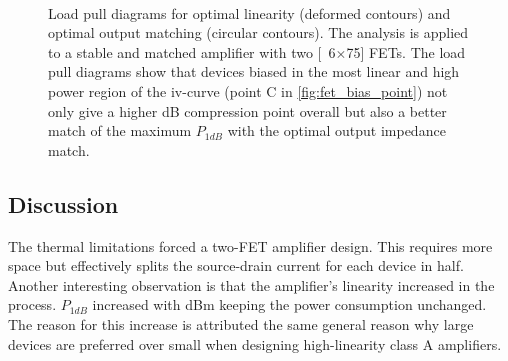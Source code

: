 				\begin{figure}[h!]
					\centering
					 \\
					\caption[Load pull diagrams for IF amplifier 2.]{Load pull diagrams for optimal linearity (deformed contours) and optimal output matching (circular contours). The analysis is applied to a stable and matched amplifier with two \unit[6$\times$75]{\mum} FETs. The load pull diagrams show that devices biased in the most linear and high power region of the iv-curve (point C in \autoref{fig:fet_bias_point}) not only give a higher \unit[1]{dB} compression point overall but also a better match of the maximum $P_{1dB}$ with the optimal output impedance match.}\label{fig:if2lp}
				\end{figure}

		\subsection{Discussion}
			The thermal limitations forced a two-FET amplifier design. This requires more space but effectively splits the source-drain current for each device in half. Another interesting observation is that the amplifier's linearity increased in the process. $P_{1dB}$ increased with \unit[4]{dBm} keeping the power consumption unchanged. The reason for this increase is attributed the same general reason why large devices are preferred over small when designing high-linearity class A amplifiers.

